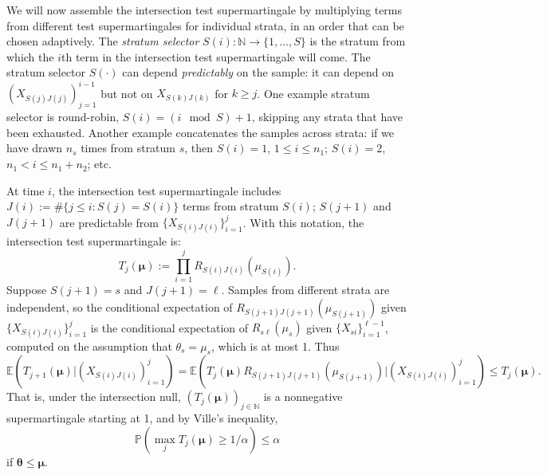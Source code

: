 \documentclass[aoas]{imsart}
\newcommand{\EE}{\mathbb{E}}
\renewcommand{\Pr}{\mathbb{P}}
\begin{document}
We will now assemble the intersection test supermartingale by multiplying terms from
different test supermartingales for individual strata, in an order that can be chosen adaptively.
The \emph{stratum selector} $S(i) : \mathbb{N} \rightarrow \{1, \ldots, S\}$ is the stratum from which the $i$th 
term in the intersection test supermartingale will come.
The stratum selector $S(\cdot)$ can depend \emph{predictably} on the sample: it can 
depend on $(X_{S(j)J(j)})_{j=1}^{i-1}$ but not on $X_{S(k)J(k)}$ for $k \ge j$.
One example stratum selector is round-robin, $S(i) = (i \mod S)+1$, skipping any strata
that have been exhausted.
Another example concatenates the samples across strata: if we have drawn $n_s$ times from stratum $s$,
then $S(i) = 1$, $1 \le i \le n_1$; $S(i) = 2$, $n_1 < i \le n_1+n_2$; etc.

At time $i$, the intersection test supermartingale includes $J(i):= \#\{j \le i : S(j)=S(i)\}$ terms from stratum $S(i)$;
$S(j+1)$ and $J(j+1)$ are predictable from $\{X_{S(i)J(i)}\}_{i=1}^j$.
With this notation, the intersection test supermartingale is:
\begin{equation}
T_j(\boldsymbol{\mu}) := \prod_{i=1}^j R_{S(i)J(i)}(\mu_{S(i)}).
\end{equation}
Suppose $S(j+1) = s$ and $J(j+1) = \ell$.
Samples from different strata are independent, so 
the conditional expectation of $R_{S(j+1)J(j+1)}(\mu_{S(j+1)})$ given $\{X_{S(i)J(i)}\}_{i=1}^j$ is the conditional expectation of
$R_{s\ell}(\mu_s)$ given $\{X_{si}\}_{i=1}^{\ell-1}$, computed on the assumption that $\theta_s = \mu_s$, which is at most 1.
Thus 
\begin{equation}
\EE \left (T_{j+1}(\boldsymbol{\mu}) | (X_{S(i)J(i)})_{i=1}^j \right ) = \EE \left (T_j(\boldsymbol{\mu}) R_{S(j+1)J(j+1)}(\mu_{S(j+1)}) | (X_{S(i)J(i)})_{i=1}^j \right ) \le T_j(\boldsymbol{\mu}).
\end{equation}
That is, under the intersection null, $(T_j(\boldsymbol{\mu}))_{j \in \mathbb{N}}$ is a nonnegative supermartingale starting at 1,
and by Ville's inequality,
\begin{equation}
    \Pr (\max_j T_j(\boldsymbol{\mu}) \ge 1/\alpha) \le \alpha
\end{equation}
if $\boldsymbol{\theta} \le \boldsymbol{\mu}$.
\end{document}

